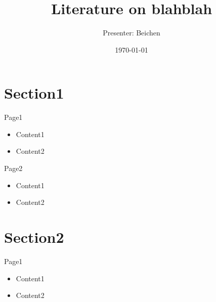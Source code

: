 \documentclass{beamer}
\title[For short]{Literature on blahblah}
\author{Presenter: Beichen}
\date{\today}
\begin{document}

\begin{frame}
  \titlepage
\end{frame}

\begin{frame}
    \tableofcontents
\end{frame}

\section{Section1}
\begin{frame}{Page1}
\begin{itemize}
  \item Content1
  \item Content2
\end{itemize}
\end{frame}

\begin{frame}{Page2}
\begin{itemize}
  \item Content1
  \item Content2
\end{itemize}
\end{frame}

\section{Section2}
\begin{frame}{Page1}
\begin{itemize}
  \item Content1
  \item Content2
\end{itemize}
\end{frame}
\end{document}
